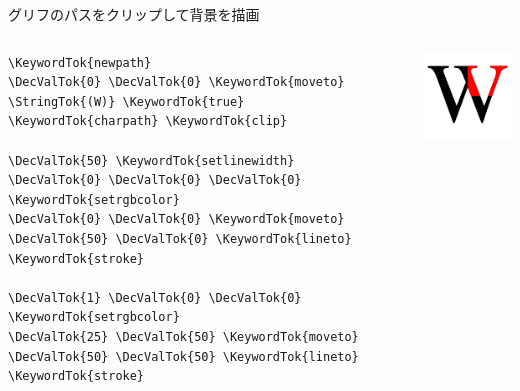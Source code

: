 \documentclass[unicode,14pt]{beamer}
\begin{document}
\begin{frame}[fragile]{グリフのパスをクリップして背景を描画}
  \sffamily
  \vspace*{-\baselineskip}
  \begin{columns}[t]
    \begin{column}{.5\textwidth}
  \begin{tcolorbox}
  \begin{Verbatim}[commandchars=\\\{\}, breaklines=true, breakanywhere=true]
\KeywordTok{newpath}
\DecValTok{0} \DecValTok{0} \KeywordTok{moveto}
\StringTok{(W)} \KeywordTok{true}
\KeywordTok{charpath} \KeywordTok{clip}

\DecValTok{50} \KeywordTok{setlinewidth}
\DecValTok{0} \DecValTok{0} \DecValTok{0} \KeywordTok{setrgbcolor}
\DecValTok{0} \DecValTok{0} \KeywordTok{moveto}
\DecValTok{50} \DecValTok{0} \KeywordTok{lineto}
\KeywordTok{stroke}

\DecValTok{1} \DecValTok{0} \DecValTok{0} \KeywordTok{setrgbcolor}
\DecValTok{25} \DecValTok{50} \KeywordTok{moveto}
\DecValTok{50} \DecValTok{50} \KeywordTok{lineto}
\KeywordTok{stroke}
  \end{Verbatim}
  \end{tcolorbox}
    \end{column}
    \begin{column}{.5\textwidth}
  \begin{center}
    \mbox{}
    \vfill
    \includegraphics[width=.75\textwidth]{figures/wclip-ps.pdf}
    \vfill
  \end{center}
    \end{column}
  \end{columns}
\end{frame}
\end{document}
